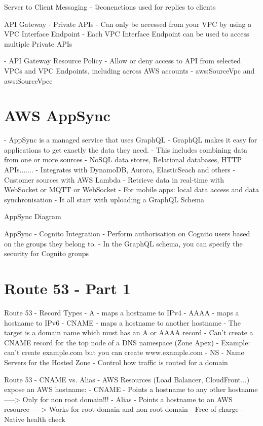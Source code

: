 Server to Client Messaging - @conenctions used for replies to clients

API Gateway - Private APIs
- Can only be accessed from your VPC by using a VPC Interface Endpoint
- Each VPC Interface Endpoint can be used to access multiple Private APIs

- API Gateway Resource Policy
- Allow or deny access to API from selected VPCs and VPC Endpoints, including across AWS accounts
- aws:SourceVpc and aws:SourceVpce


\section{AWS AppSync}
- AppSync is a managed service that uses GraphQL
- GraphQL makes it easy for applications to get exactly the data they need.
- This includes combining data from one or more sources
- NoSQL data stores, Relational databases, HTTP APIs.......
- Integrates with DynamoDB, Aurora, ElasticSeach and others
- Customer sources with AWS Lambda
- Retrieve data in real-time with WebSocket or MQTT or WebSocket
- For mobile apps: local data access and data synchronisation
- It all start with uploading a GraphQL Schema

AppSync Diagram

AppSync - Cognito Integration
- Perform authorisation on Cognito users based on the groups they belong to.
- In the GraphQL schema, you can specify the security for Cognito groups


\section{Route 53 - Part 1}
Route 53 - Record Types
- A - maps a hostname to IPv4
- AAAA - maps a hostname to IPv6
- CNAME - maps a hostname to another hostname
- The target is a domain name which must has an A or AAAA record
- Can't create a CNAME record for the top node of a DNS namespace (Zone Apex)
- Example: can't create example.com but you can create www.example.com
- NS - Name Servers for the Hosted Zone
- Control how traffic is routed for a domain


Route 53 - CNAME vs. Alias
- AWS Resources (Load Balancer, CloudFront...) expose an AWS hostname:
- CNAME
- Points a hostname to any other hostname
-----> Only for non root domain!!!
- Alias
- Points a hostname to an AWS resource
----> Works for root domain and non root domain
- Free of charge
- Native health check

